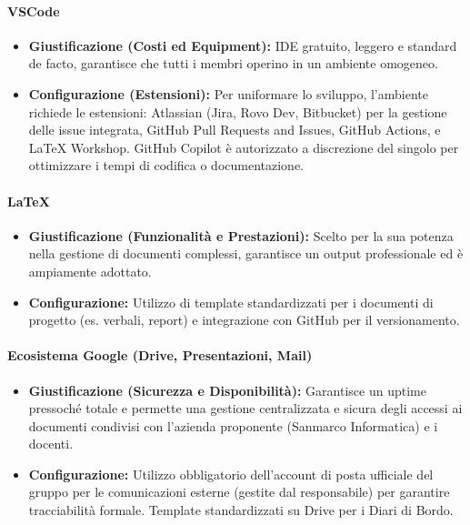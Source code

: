 \documentclass[a4paper,12pt]{article}
\begin{document}
\paragraph{VSCode} \label{vscode}
\begin{itemize}
    \item \textbf{Giustificazione (Costi ed Equipment):} IDE gratuito, leggero e standard de facto, garantisce che tutti i membri operino in un ambiente omogeneo.
    \item \textbf{Configurazione (Estensioni):} Per uniformare lo sviluppo, l'ambiente richiede le estensioni: Atlassian (Jira, Rovo Dev, Bitbucket) per la gestione delle issue integrata, GitHub Pull Requests and Issues, GitHub Actions, e LaTeX Workshop. GitHub Copilot è autorizzato a discrezione del singolo per ottimizzare i tempi di codifica o documentazione.
\end{itemize}

\paragraph{\LaTeX} \label{LaTeX}
\begin{itemize}
    \item \textbf{Giustificazione (Funzionalità e Prestazioni):} Scelto per la sua potenza nella gestione di documenti complessi, garantisce un output professionale ed è ampiamente adottato.
    \item \textbf{Configurazione:} Utilizzo di template standardizzati per i documenti di progetto (es. verbali, report) e integrazione con GitHub per il versionamento.
\end{itemize}

\paragraph{Ecosistema Google (Drive, Presentazioni, Mail)}
\begin{itemize}
    \item \textbf{Giustificazione (Sicurezza e Disponibilità):} Garantisce un uptime pressoché totale e permette una gestione centralizzata e sicura degli accessi ai documenti condivisi con l'azienda proponente (Sanmarco Informatica) e i docenti.
    \item \textbf{Configurazione:} Utilizzo obbligatorio dell'account di posta ufficiale del gruppo per le comunicazioni esterne (gestite dal responsabile) per garantire tracciabilità formale. Template standardizzati su Drive per i Diari di Bordo.
\end{itemize}
\end{document}

